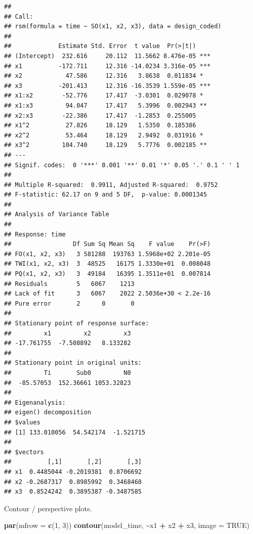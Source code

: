 \documentclass[
]{article}
\newenvironment{Shaded}{\begin{snugshade}}{\end{snugshade}}
\newcommand{\AttributeTok}[1]{\textcolor[rgb]{0.13,0.29,0.53}{#1}}
\newcommand{\ConstantTok}[1]{\textcolor[rgb]{0.56,0.35,0.01}{#1}}
\newcommand{\DecValTok}[1]{\textcolor[rgb]{0.00,0.00,0.81}{#1}}
\newcommand{\FunctionTok}[1]{\textcolor[rgb]{0.13,0.29,0.53}{\textbf{#1}}}
\newcommand{\NormalTok}[1]{#1}
\newcommand{\SpecialCharTok}[1]{\textcolor[rgb]{0.81,0.36,0.00}{\textbf{#1}}}
\begin{document}
\begin{verbatim}
## 
## Call:
## rsm(formula = time ~ SO(x1, x2, x3), data = design_coded)
## 
##             Estimate Std. Error  t value  Pr(>|t|)    
## (Intercept)  232.616     20.112  11.5662 8.476e-05 ***
## x1          -172.711     12.316 -14.0234 3.316e-05 ***
## x2            47.586     12.316   3.8638  0.011834 *  
## x3          -201.413     12.316 -16.3539 1.559e-05 ***
## x1:x2        -52.776     17.417  -3.0301  0.029078 *  
## x1:x3         94.047     17.417   5.3996  0.002943 ** 
## x2:x3        -22.386     17.417  -1.2853  0.255005    
## x1^2          27.826     18.129   1.5350  0.185386    
## x2^2          53.464     18.129   2.9492  0.031916 *  
## x3^2         104.740     18.129   5.7776  0.002185 ** 
## ---
## Signif. codes:  0 '***' 0.001 '**' 0.01 '*' 0.05 '.' 0.1 ' ' 1
## 
## Multiple R-squared:  0.9911, Adjusted R-squared:  0.9752 
## F-statistic: 62.17 on 9 and 5 DF,  p-value: 0.0001345
## 
## Analysis of Variance Table
## 
## Response: time
##                 Df Sum Sq Mean Sq    F value    Pr(>F)
## FO(x1, x2, x3)   3 581288  193763 1.5968e+02 2.201e-05
## TWI(x1, x2, x3)  3  48525   16175 1.3330e+01  0.008048
## PQ(x1, x2, x3)   3  49184   16395 1.3511e+01  0.007814
## Residuals        5   6067    1213                     
## Lack of fit      3   6067    2022 2.5036e+30 < 2.2e-16
## Pure error       2      0       0                     
## 
## Stationary point of response surface:
##         x1         x2         x3 
## -17.761755  -7.508892   8.133282 
## 
## Stationary point in original units:
##         Ti       Sub0         N0 
##  -85.57053  152.36661 1053.32823 
## 
## Eigenanalysis:
## eigen() decomposition
## $values
## [1] 133.010056  54.542174  -1.521715
## 
## $vectors
##          [,1]       [,2]       [,3]
## x1  0.4485044 -0.2019381  0.8706692
## x2 -0.2687317  0.8985992  0.3468468
## x3  0.8524242  0.3895387 -0.3487585
\end{verbatim}

Contour / perspective plots.

\begin{Shaded}
\begin{Highlighting}[]
\FunctionTok{par}\NormalTok{(}\AttributeTok{mfrow =} \FunctionTok{c}\NormalTok{(}\DecValTok{1}\NormalTok{, }\DecValTok{3}\NormalTok{))}
\FunctionTok{contour}\NormalTok{(model\_time, }\SpecialCharTok{\textasciitilde{}}\NormalTok{x1 }\SpecialCharTok{+}\NormalTok{ x2 }\SpecialCharTok{+}\NormalTok{ x3, }\AttributeTok{image =} \ConstantTok{TRUE}\NormalTok{)}
\end{Highlighting}
\end{Shaded}
\end{document}
